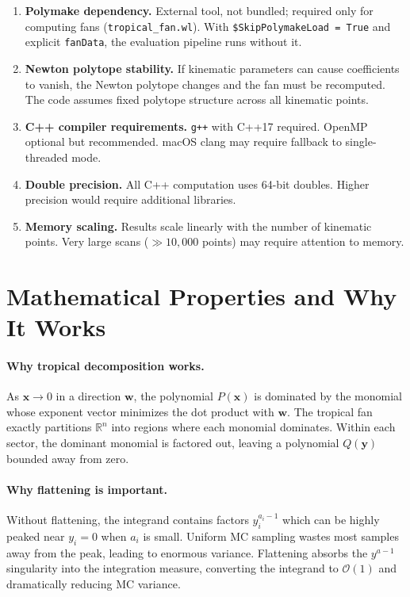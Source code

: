 \documentclass[11pt,a4paper]{article}
\begin{document}
\begin{enumerate}
  \item \textbf{Polymake dependency.} External tool, not bundled; required only for computing fans (\texttt{tropical\_fan.wl}). With \texttt{\$SkipPolymakeLoad = True} and explicit \texttt{fanData}, the evaluation pipeline runs without it.

  \item \textbf{Newton polytope stability.} If kinematic parameters can cause coefficients to vanish, the Newton polytope changes and the fan must be recomputed. The code assumes fixed polytope structure across all kinematic points.

  \item \textbf{C++ compiler requirements.} \texttt{g++} with C++17 required. OpenMP optional but recommended. macOS clang may require fallback to single-threaded mode.

  \item \textbf{Double precision.} All C++ computation uses 64-bit doubles. Higher precision would require additional libraries.

  \item \textbf{Memory scaling.} Results scale linearly with the number of kinematic points. Very large scans ($\gg 10{,}000$ points) may require attention to memory.
\end{enumerate}

\section{Mathematical Properties and Why It Works}

\paragraph{Why tropical decomposition works.}
As $\mathbf{x} \to 0$ in a direction $\mathbf{w}$, the polynomial $P(\mathbf{x})$ is dominated by the monomial whose exponent vector minimizes the dot product with $\mathbf{w}$. The tropical fan exactly partitions $\mathbb{R}^n$ into regions where each monomial dominates. Within each sector, the dominant monomial is factored out, leaving a polynomial $Q(\mathbf{y})$ bounded away from zero.

\paragraph{Why flattening is important.}
Without flattening, the integrand contains factors $y_i^{a_i - 1}$ which can be highly peaked near $y_i = 0$ when $a_i$ is small. Uniform MC sampling wastes most samples away from the peak, leading to enormous variance. Flattening absorbs the $y^{a-1}$ singularity into the integration measure, converting the integrand to $\mathcal{O}(1)$ and dramatically reducing MC variance.
\end{document}
